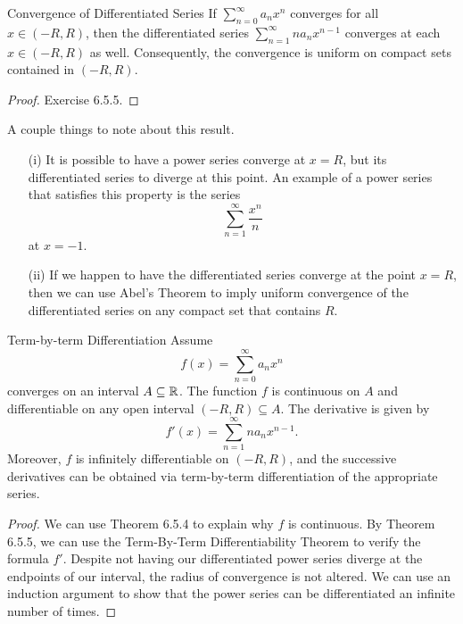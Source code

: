 \begin{theorem}{Convergence of Differentiated Series}{}
    If \( \sum_{ n=0  }^{  \infty  } a_n x^n  \) converges for all \( x \in (-R , R ) \), then the differentiated series \( \sum_{ n=1  }^{  \infty  } na_n x^{n-1} \) converges at each \( x \in (-R , R ) \) as well. Consequently, the convergence is uniform on compact sets contained in \( (-R , R ) \).
\end{theorem}

\begin{proof}
Exercise 6.5.5.
\end{proof}

A couple things to note about this result.
\begin{enumerate}
    \item[(i)] It is possible to have a power series converge at \( x =R  \), but its differentiated series to diverge at this point. An example of a power series that satisfies this property is the series 
        \[  \sum_{ n=1  }^{  \infty  } \frac{ x^n  }{ n } \]
        at \( x = -1  \). 
    \item[(ii)] If we happen to have the differentiated series converge at the point \( x = R  \), then we can use Abel's Theorem to imply uniform convergence of the differentiated series on any compact set that contains \( R  \).
\end{enumerate}

\begin{theorem}{Term-by-term Differentiation}{}
Assume 
\[  f(x) = \sum_{ n=0 }^{ \infty  } a_n x^n  \] converges on an interval \( A \subseteq \mathbb{R}  \). The function \( f  \) is continuous on \( A  \) and differentiable on any open interval \( (-R , R ) \subseteq A \). The derivative is given by 
\[  f'(x) = \sum_{ n=1  }^{  \infty  } n a_n x^{n-1}. \]
Moreover, \( f  \) is infinitely differentiable on \( (-R ,R ) \), and the successive derivatives can be obtained via term-by-term differentiation of the appropriate series.
\end{theorem}

\begin{proof}
We can use Theorem 6.5.4 to explain why \( f  \) is continuous. By Theorem 6.5.5, we can use the Term-By-Term Differentiability Theorem to verify the formula \( f' \). Despite not having our differentiated power series diverge at the endpoints of our interval, the radius of convergence is not altered. We can use an induction argument to show that the power series can be differentiated an infinite number of times.
\end{proof}

